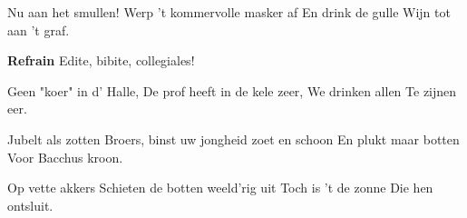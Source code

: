 \footnotemark [
ititle={Oud tafellied},
tu={Edite, bibite, collegiales (Chr. W. Kindleben, étud. en théologie, Halle 1767).}]


\beginverse
Nu aan het smullen!
Werp 't kommervolle masker af
En drink de gulle
Wijn tot aan 't graf.
\endverse

\beginchorus
\textbf{Refrain}
Edite, bibite, collegiales!
\endchorus

\beginverse
Geen "koer" in d' Halle,
De prof heeft in de kele zeer,
We drinken allen
Te zijnen eer.
\endverse

\beginverse
Jubelt als zotten
Broers, binst uw jongheid zoet en schoon
En plukt maar botten
Voor Bacchus kroon.
\endverse

\beginverse
Op vette akkers
Schieten de botten weeld'rig uit
Toch is 't de zonne 
Die hen ontsluit.
\endverse
\endsong